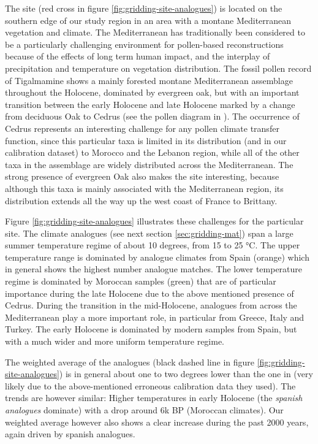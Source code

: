\begin{refsection}
The site (red cross in figure \ref{fig:gridding-site-analogues}) is located on the southern edge of our study region in an area with a montane Mediterranean vegetation and climate. The Mediterranean has traditionally been considered to be a particularly challenging environment for pollen-based reconstructions because of the effects of long term human impact, and the interplay of precipitation and temperature on vegetation distribution. The fossil pollen record of Tigalmamine shows a mainly forested montane Mediterranean assemblage throughout the Holocene, dominated by evergreen oak, but with an important transition between the early Holocene and late Holocene marked by a change from deciduous Oak to Cedrus (see the pollen diagram in \cite{CheddadiLambGuiotEtAl1998}). The occurrence of Cedrus represents an interesting challenge for any pollen climate transfer function, since this particular taxa is limited in its distribution (and in our calibration dataset) to Morocco and the Lebanon region, while all of the other taxa in the assemblage are widely distributed across the Mediterranean. The strong presence of evergreen Oak also makes the site interesting, because although this taxa is mainly associated with the Mediterranean region, its distribution extends all the way up the west coast of France to Brittany.

Figure \ref{fig:gridding-site-analogues} illustrates these challenges for the particular site. The climate analogues (see next section \ref{sec:gridding-mat}) span a large summer temperature regime of about 10 degrees, from 15 to 25 °C. The upper temperature range is dominated by analogue climates from Spain (orange) which in general shows the highest number analogue matches. The lower temperature regime is dominated by Moroccan samples (green) that are of particular importance during the late Holocene due to the above mentioned presence of Cedrus. During the transition in the mid-Holocene, analogues from across the Mediterranean play a more important role, in particular from Greece, Italy and Turkey. The early Holocene is dominated by modern samples from Spain, but with a much wider and more uniform temperature regime.

The weighted average of the analogues (black dashed line in figure \ref{fig:gridding-site-analogues}) is in general about one to two degrees lower than the one in \cite{CheddadiLambGuiotEtAl1998} (very likely due to the above-mentioned erroneous calibration data they used). The trends are however similar: Higher temperatures in early Holocene  (the \textit{spanish analogues} dominate) with a drop around 6k BP (Moroccan climates). Our weighted average however also shows a clear increase during the past 2000 years, again driven by spanish analogues.


\end{refsection}
